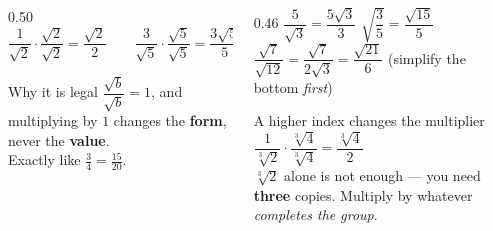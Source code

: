 \documentclass[aspectratio=169, 11pt]{beamer}
\begin{document}
\begin{frame}[t, plain]
  \begin{columns}[T]
    \begin{column}{0.50\textwidth}
      \[ \frac{1}{\sqrt2}\cdot\frac{\sqrt2}{\sqrt2}=\frac{\sqrt2}{2}
         \qquad
         \frac{3}{\sqrt5}\cdot\frac{\sqrt5}{\sqrt5}=\frac{3\sqrt5}{5} \]
      \vspace{-6pt}
      \begin{block}{Why it is legal}
        \centering $\dfrac{\sqrt b}{\sqrt b}=1$, and multiplying by $1$ changes the
        \textbf{form}, never the \textbf{value}. \\[3pt]
        {\footnotesize Exactly like $\frac34=\frac{15}{20}$.}
      \end{block}
    \end{column}
    \begin{column}{0.46\textwidth}
      \footnotesize
      $\dfrac{5}{\sqrt3}=\dfrac{5\sqrt3}{3}$ \qquad
      $\sqrt{\dfrac{3}{5}}=\dfrac{\sqrt{15}}{5}$ \\[5pt]
      $\dfrac{\sqrt7}{\sqrt{12}}=\dfrac{\sqrt7}{2\sqrt3}=\dfrac{\sqrt{21}}{6}$
      \; {\scriptsize (simplify the bottom \emph{first})}
      \vspace{8pt}

      \begin{block}{A higher index changes the multiplier}
        $\dfrac{1}{\sqrt[3]2}\cdot\dfrac{\sqrt[3]4}{\sqrt[3]4}=\dfrac{\sqrt[3]4}{2}$ \\[4pt]
        {\footnotesize $\sqrt[3]2$ alone is not enough --- you need \textbf{three} copies.
        Multiply by whatever \emph{completes the group}.}
      \end{block}
    \end{column}
  \end{columns}
\end{frame}
\end{document}
